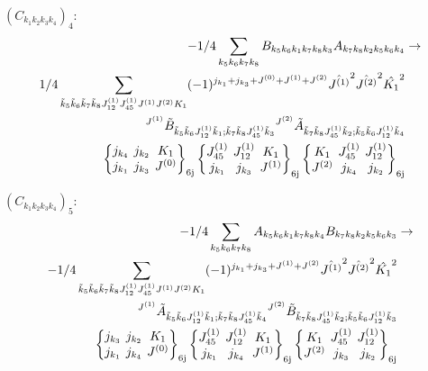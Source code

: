 \documentclass[11pt]{article}
\newcommand{\sixj}[6]{\begingroup\setlength{\arraycolsep}{0.2em}\begin{Bmatrix} #1 & #2 & #3 \\ #4 & #5 & #6 \end{Bmatrix}_{\text{6j}}\endgroup}
\begin{document}
$\left({C}_{{k}_{1}{k}_{2}{k}_{3}{k}_{4}}\right)_{4}$:
\begin{align}
-1/4\sum_{{k}_{5}{k}_{6}{k}_{7}{k}_{8}}{B}_{{k}_{5}{k}_{6}{k}_{1}{k}_{7}{k}_{8}{k}_{3}}{A}_{{k}_{7}{k}_{8}{k}_{2}{k}_{5}{k}_{6}{k}_{4}}&\rightarrow \notag \\1/4\sum_{\tilde{k}_{5}\tilde{k}_{6}\tilde{k}_{7}\tilde{k}_{8}J^{(1)}_{12}J^{(1)}_{45}J^{(1)}J^{(2)}K_{1}}(-1)^{j_{{k}_{1}} +j_{{k}_{3}} +J^{(0)} +J^{(1)} +J^{(2)} }\hat{J^{(1)}}^{2}\hat{J^{(2)}}^{2}\hat{K_{1}}^{2}& \notag \\{}^{J^{(1)}}\tilde{B}_{\tilde{k}_{5}\tilde{k}_{6}J^{(1)}_{12}\tilde{k}_{1};\tilde{k}_{7}\tilde{k}_{8}J^{(1)}_{45}\tilde{k}_{3}}{}^{J^{(2)}}\tilde{A}_{\tilde{k}_{7}\tilde{k}_{8}J^{(1)}_{45}\tilde{k}_{2};\tilde{k}_{5}\tilde{k}_{6}J^{(1)}_{12}\tilde{k}_{4}}& \notag \\\sixj{j_{{k}_{4}}}{j_{{k}_{2}}}{K_{1}}{j_{{k}_{1}}}{j_{{k}_{3}}}{J^{(0)}}\sixj{J^{(1)}_{45}}{J^{(1)}_{12}}{K_{1}}{j_{{k}_{1}}}{j_{{k}_{3}}}{J^{(1)}}\sixj{K_{1}}{J^{(1)}_{45}}{J^{(1)}_{12}}{J^{(2)}}{j_{{k}_{4}}}{j_{{k}_{2}}}
\end{align}

$\left({C}_{{k}_{1}{k}_{2}{k}_{3}{k}_{4}}\right)_{5}$:
\begin{align}
-1/4\sum_{{k}_{5}{k}_{6}{k}_{7}{k}_{8}}{A}_{{k}_{5}{k}_{6}{k}_{1}{k}_{7}{k}_{8}{k}_{4}}{B}_{{k}_{7}{k}_{8}{k}_{2}{k}_{5}{k}_{6}{k}_{3}}&\rightarrow \notag \\-1/4\sum_{\tilde{k}_{5}\tilde{k}_{6}\tilde{k}_{7}\tilde{k}_{8}J^{(1)}_{12}J^{(1)}_{45}J^{(1)}J^{(2)}K_{1}}(-1)^{j_{{k}_{1}} +j_{{k}_{3}} +J^{(1)} +J^{(2)} }\hat{J^{(1)}}^{2}\hat{J^{(2)}}^{2}\hat{K_{1}}^{2}& \notag \\{}^{J^{(1)}}\tilde{A}_{\tilde{k}_{5}\tilde{k}_{6}J^{(1)}_{12}\tilde{k}_{1};\tilde{k}_{7}\tilde{k}_{8}J^{(1)}_{45}\tilde{k}_{4}}{}^{J^{(2)}}\tilde{B}_{\tilde{k}_{7}\tilde{k}_{8}J^{(1)}_{45}\tilde{k}_{2};\tilde{k}_{5}\tilde{k}_{6}J^{(1)}_{12}\tilde{k}_{3}}& \notag \\\sixj{j_{{k}_{3}}}{j_{{k}_{2}}}{K_{1}}{j_{{k}_{1}}}{j_{{k}_{4}}}{J^{(0)}}\sixj{J^{(1)}_{45}}{J^{(1)}_{12}}{K_{1}}{j_{{k}_{1}}}{j_{{k}_{4}}}{J^{(1)}}\sixj{K_{1}}{J^{(1)}_{45}}{J^{(1)}_{12}}{J^{(2)}}{j_{{k}_{3}}}{j_{{k}_{2}}}
\end{align}
\end{document}
